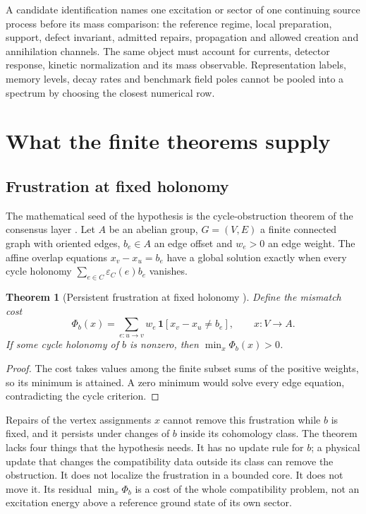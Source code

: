 \documentclass[11pt]{article}
\newtheorem{theorem}{Theorem}[section]
\begin{document}
A candidate identification names one excitation or sector of one continuing
source process before its mass comparison: the reference regime, local
preparation, support, defect invariant, admitted repairs, propagation and
allowed creation and annihilation channels. The same object must account for
currents, detector response, kinetic normalization and its mass observable.
Representation labels, memory levels, decay rates and benchmark field poles
cannot be pooled into a spectrum by choosing the closest numerical row.

\section{What the finite theorems supply}
\label{sec:finite-supply}

\subsection{Frustration at fixed holonomy}

The mathematical seed of the hypothesis is the cycle-obstruction theorem of
the consensus layer \cite{ophconsensus}. Let \(A\) be an abelian group,
\(G=(V,E)\) a finite connected graph with oriented edges, \(b_e\in A\) an
edge offset and \(w_e>0\) an edge weight. The affine overlap equations
\(x_v-x_u=b_e\) have a global solution exactly when every cycle holonomy
\(\sum_{e\in C}\varepsilon_C(e)b_e\) vanishes.

\begin{theorem}[Persistent frustration at fixed holonomy {\cite{ophconsensus}}]
\label{thm:fixed-holonomy-frustration}
Define the mismatch cost
\[
 \Phi_b(x)=\sum_{e:u\to v}w_e\,\mathbf 1[x_v-x_u\neq b_e],
 \qquad x:V\to A.
\]
If some cycle holonomy of \(b\) is nonzero, then
\(\min_x\Phi_b(x)>0\).
\end{theorem}

\begin{proof}
The cost takes values among the finite subset sums of the positive weights,
so its minimum is attained. A zero minimum would solve every edge equation,
contradicting the cycle criterion.
\end{proof}

Repairs of the vertex assignments \(x\) cannot remove this frustration while
\(b\) is fixed, and it persists under changes of \(b\) inside its cohomology
class. The theorem lacks four things that the hypothesis needs. It has no
update rule for \(b\); a physical update that changes the compatibility data
outside its class can remove the obstruction. It does not localize the
frustration in a bounded core. It does not move it. Its residual
\(\min_x\Phi_b\) is a cost of the whole compatibility problem, not an
excitation energy above a reference ground state of its own sector.
\end{document}
